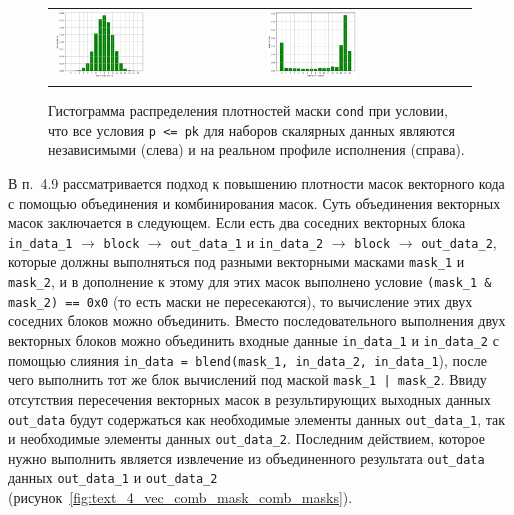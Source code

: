 \documentclass[a4paper,14pt]{extarticle}                     %
\theoremstyle{plain}                                         %
\begin{document}
\begin{figure}[ht]
\centering
\begin{tabular}{ll}
\includegraphics[width=0.45\textwidth]{./pics/text_4_vec_comb_mask/independent_p.png}
&
\includegraphics[width=0.45\textwidth]{./pics/text_4_vec_comb_mask/real_p.png}
\end{tabular}
\singlespacing
{}\caption{Гистограмма распределения плотностей маски \texttt{cond} при условии, что все условия \texttt{p <= pk} для наборов скалярных данных являются независимыми (слева) и на реальном профиле исполнения (справа).}
\label{fig:text_4_vec_comb_mask_independent_p}
\end{figure}


В п.~4.9 рассматривается подход к повышению плотности масок векторного кода с помощью объединения и комбинирования масок.
Суть объединения векторных масок заключается в следующем.
Если есть два соседних векторных блока \texttt{in\_data\_1} $\rightarrow$ \texttt{block} $\rightarrow$ \texttt{out\_data\_1} и \texttt{in\_data\_2} $\rightarrow$ \texttt{block} $\rightarrow$ \texttt{out\_data\_2}, которые должны выполняться под разными векторными масками\label{term:vector_mask5} \texttt{mask\_1} и \texttt{mask\_2}, и в дополнение к этому для этих масок выполнено условие \texttt{(mask\_1 \& mask\_2) == 0x0} (то есть маски не пересекаются), то вычисление этих двух соседних блоков можно объединить.
Вместо последовательного выполнения двух векторных блоков можно объединить входные данные \texttt{in\_data\_1} и \texttt{in\_data\_2} с помощью слияния \texttt{in\_data = blend(mask\_1, in\_data\_2, in\_data\_1}), после чего выполнить тот же блок вычислений под маской \texttt{mask\_1 | mask\_2}.
Ввиду отсутствия пересечения векторных масок в результирующих выходных данных \texttt{out\_data} будут содержаться как необходимые элементы данных \texttt{out\_data\_1}, так и необходимые элементы данных \texttt{out\_data\_2}.
Последним действием, которое нужно выполнить является извлечение из объединенного результата \texttt{out\_data} данных \texttt{out\_data\_1} и \texttt{out\_data\_2} (рисунок~\ref{fig:text_4_vec_comb_mask_comb_masks}).
\end{document}
